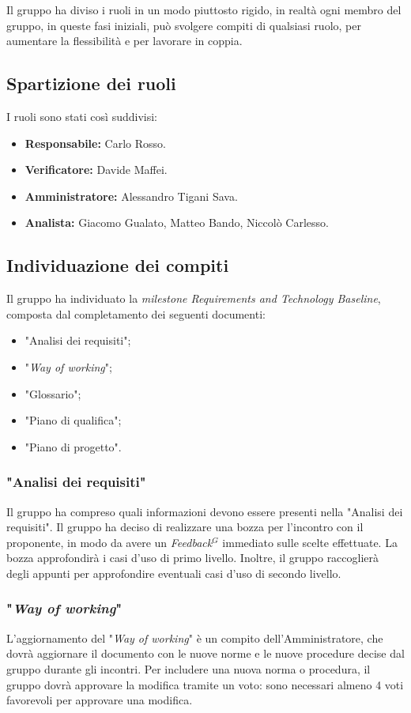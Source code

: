 Il gruppo ha diviso i ruoli in un modo piuttosto rigido, in realtà ogni membro
del gruppo, in queste fasi iniziali, può svolgere compiti di qualsiasi ruolo,
per aumentare la flessibilità e per lavorare in coppia.

\subsection{Spartizione dei ruoli}
I ruoli sono stati così suddivisi:
\begin{itemize}
	\item \textbf{Responsabile:} Carlo Rosso.
	\item \textbf{Verificatore:} Davide Maffei.
	\item \textbf{Amministratore:} Alessandro Tigani Sava.
	\item \textbf{Analista:} Giacomo Gualato, Matteo Bando, Niccolò Carlesso.
\end{itemize}

\subsection{Individuazione dei compiti}
Il gruppo ha individuato la  \textit{milestone Requirements and Technology
	Baseline}, composta dal completamento dei seguenti documenti:
\begin{itemize}
	\item "Analisi dei requisiti";
	\item "\textit{Way of working}";
	\item "Glossario";
	\item "Piano di qualifica";
	\item "Piano di progetto".
\end{itemize}

\subsubsection{"Analisi dei requisiti"}
Il gruppo ha compreso quali informazioni devono essere presenti nella "Analisi
dei requisiti". Il gruppo ha deciso di realizzare
una bozza per l'incontro con il proponente, in modo da avere un
\textit{\gls{Feedback}$^G$} immediato sulle scelte effettuate. La bozza approfondirà i
casi d'uso di primo livello. Inoltre, il gruppo raccoglierà degli appunti per
approfondire eventuali casi d'uso di secondo livello.

\subsubsection{"\textit{Way of working}"}
L'aggiornamento del "\textit{Way of working}" è un compito dell'Amministratore,
che dovrà aggiornare il documento con le nuove norme e le nuove procedure
decise dal gruppo durante gli incontri. Per includere una nuova norma o
procedura, il gruppo dovrà approvare la modifica tramite un voto: sono
necessari almeno 4 voti favorevoli per approvare una modifica.

